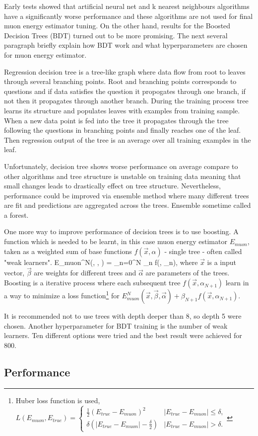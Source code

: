 Early tests showed that artificial neural net and k nearest neighbours algorithms have a 
significantly worse performance and these algorithms are not used for final muon energy 
estimator tuning. On the other hand, results for the Boosted Decision Trees (BDT) turned out
to be more promising. The next several paragraph briefly explain how BDT work and what 
hyperparameters are chosen for muon energy estimator.

Regression decision tree is a tree-like graph where data flow from root to leaves through 
several branching points. Root and branching points corresponds to questions and if data 
satisfies the question it propogates through one branch, if not then it propagates through
another branch. During the training process tree learns its structure and populates leaves 
with examples from training sample. When a new data point is fed into the tree it propagates
through the tree following the questions in branching points and finally reaches one of the leaf. 
Then regression output of the tree is an average over all training examples in the leaf. 

Unfortunately, decision tree shows worse performance on average compare to other algorithms 
and tree structure is unstable on training data meaning that small changes leads to drastically 
effect on tree structure. Nevertheless, performance could be improved via ensemble method 
where many different trees are fit and predictions are aggregated across the trees. Ensemble 
sometime called a forest.

One more way to improve performance of decision trees is to use boosting. A function which is 
needed to be learnt, in this case muon energy estimator $E_{muon}$, taken as a weighted sum of 
base functions $f(\vec{x}, \alpha)$ - single tree - often called "weak learners". 
\be
E_{muon}^N(, \vec{\beta}, \vec{\alpha}) = \sum_{n=0}^N \beta_n f(, \alpha_n),
\ee
where $\vec{x}$ is a input vector, $\vec{\beta}$ are weights for different trees and $\vec{\alpha}$
are parameters of the trees. Boosting is a iterative process where each subsequent tree 
$f(\vec{x}, \alpha_{N+1})$ learn in a way to minimize a loss function\footnote{Huber loss function
is used,
$
L(E_{muon}, E_{true}) = \begin{cases}
				\frac{1}{2}(E_{true} - E_{muon})^2 & |E_{true} - E_{muon}| \leq \delta, \\
				\delta(|E_{true} - E_{muon}| - \frac{\delta}{2}) & |E_{true} - E_{muon}| > \delta.
			\end{cases}
$} for $E_{muon}^N(\vec{x}, \vec{\beta}, \vec{\alpha}) + \beta_{N+1}f(\vec{x}, \alpha_{N+1})$.

It is recommended not to use trees with depth deeper than 8, so depth 5 were chosen. Another 
hyperparameter for BDT training is the number of weak learners. Ten different options were tried
and the best result were achieved for 800.

\subsection{Performance}
